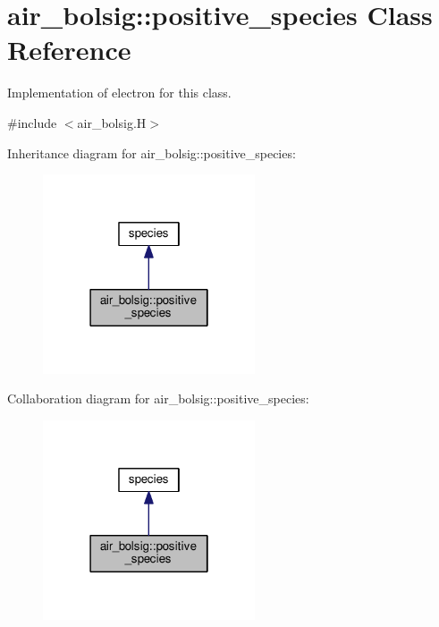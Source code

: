 \hypertarget{classair__bolsig_1_1positive__species}{}\section{air\+\_\+bolsig\+:\+:positive\+\_\+species Class Reference}
\label{classair__bolsig_1_1positive__species}


Implementation of electron for this class.  




{\ttfamily \#include $<$air\+\_\+bolsig.\+H$>$}



Inheritance diagram for air\+\_\+bolsig\+:\+:positive\+\_\+species\+:\nopagebreak
\begin{figure}[H]
\begin{center}
\leavevmode
\includegraphics[width=178pt]{classair__bolsig_1_1positive__species__inherit__graph}
\end{center}
\end{figure}


Collaboration diagram for air\+\_\+bolsig\+:\+:positive\+\_\+species\+:\nopagebreak
\begin{figure}[H]
\begin{center}
\leavevmode
\includegraphics[width=178pt]{classair__bolsig_1_1positive__species__coll__graph}
\end{center}
\end{figure}
